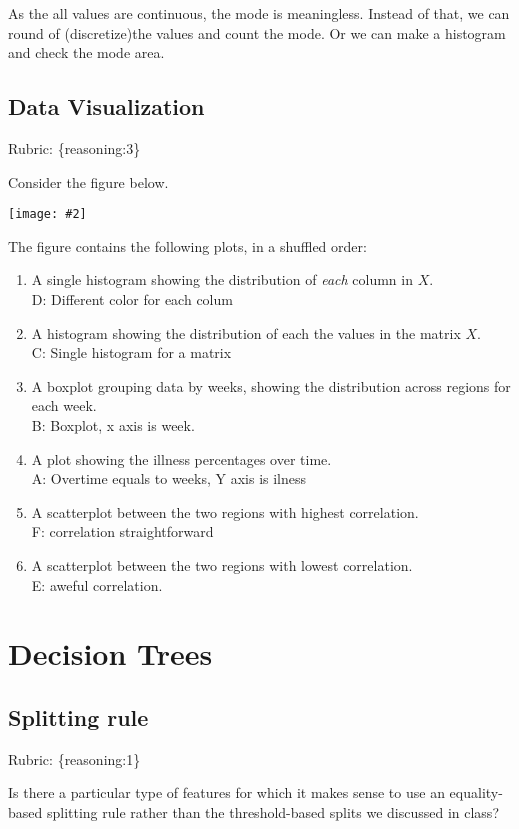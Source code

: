 \documentclass{article}
\def\gre#1{{\color{gre}#1}}
\newcommand{\fig}[2]{\texttt{[image: \#2]}}
\def\enum#1{\begin{enumerate}#1\end{enumerate}}
\def\rubric#1{\gre{Rubric: \{#1\}}}{}
\begin{document}
As the all values are continuous, the mode is meaningless. Instead of that, we can round of (discretize)the values and count the mode. Or we can make a histogram and check the mode area.



\subsection{Data Visualization}
\rubric{reasoning:3}

Consider the figure below.

\fig{1}{../figs/q12visualize-unlabeled}

The figure contains the following plots, in a shuffled order:
\enum{
\item A single histogram showing the distribution of \emph{each} column in $X$.\\D: Different color for each colum
\item A histogram showing the distribution of each the values in the matrix $X$.\\C: Single histogram for a matrix
\item A boxplot grouping data by weeks, showing the distribution across regions for each week.\\B: Boxplot, x axis is week.
\item A plot showing the illness percentages over time.\\A: Overtime equals to weeks, Y axis is ilness
\item A scatterplot between the two regions with highest correlation.\\F: correlation straightforward
\item A scatterplot between the two regions with lowest correlation.\\E: aweful correlation. 
}







\section{Decision Trees}


\subsection{Splitting rule}
\rubric{reasoning:1}

Is there a particular type of features for which it makes sense to use an equality-based splitting rule rather than the threshold-based splits we discussed in class?\\
\end{document}
